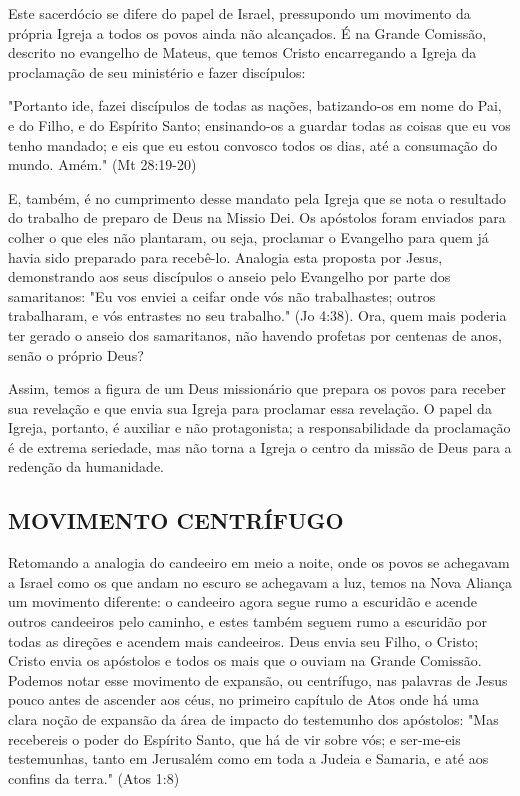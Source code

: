 \documentclass[
    article,            %
	12pt,				%
	oneside,			%
	a4paper,			%
	chapter=TITLE,		%
	section=TITLE,		%
	english,			%
	french,				%
	spanish,			%
	brazil				%
	]{abntex2}
\begin{document}
Este sacerdócio se difere do papel de Israel, pressupondo um movimento da própria Igreja a todos os povos ainda não alcançados. É na Grande Comissão, descrito no evangelho de Mateus, que temos Cristo encarregando a Igreja da proclamação de seu ministério e fazer discípulos:
\begin{citacao}
"Portanto ide, fazei discípulos de todas as nações, batizando-os em nome do Pai, e do Filho, e do Espírito Santo; ensinando-os a guardar todas as coisas que eu vos tenho mandado; e eis que eu estou convosco todos os dias, até a consumação do mundo. Amém." (Mt 28:19-20)
\end{citacao}
E, também, é no cumprimento desse mandato pela Igreja que se nota o resultado do trabalho de preparo de Deus na Missio Dei. Os apóstolos foram enviados para colher o que eles não plantaram, ou seja, proclamar o Evangelho para quem já havia sido preparado para recebê-lo. Analogia esta proposta por Jesus, demonstrando aos seus discípulos o anseio pelo Evangelho por parte dos samaritanos: "Eu vos enviei a ceifar onde vós não trabalhastes; outros trabalharam, e vós entrastes no seu trabalho." (Jo 4:38). Ora, quem mais poderia ter gerado o anseio dos samaritanos, não havendo profetas por centenas de anos, senão o próprio Deus?

Assim, temos a figura de um Deus missionário que prepara os povos para receber sua revelação e que envia sua Igreja para proclamar essa revelação. O papel da Igreja, portanto, é auxiliar e não protagonista; a responsabilidade da proclamação é de extrema seriedade, mas não torna a Igreja o centro da missão de Deus para a redenção da humanidade.

\subsection{MOVIMENTO CENTRÍFUGO}
Retomando a analogia do candeeiro em meio a noite, onde os povos se achegavam a Israel como os que andam no escuro se achegavam a luz, temos na Nova Aliança um movimento diferente: o candeeiro agora segue rumo a escuridão e acende outros candeeiros pelo caminho, e estes também seguem rumo a escuridão por todas as direções e acendem mais candeeiros. Deus envia seu Filho, o Cristo; Cristo envia os apóstolos e todos os mais que o ouviam na Grande Comissão. Podemos notar esse movimento de expansão, ou centrífugo, nas palavras de Jesus pouco antes de ascender aos céus, no primeiro capítulo de Atos onde há uma clara noção de expansão da área de impacto do testemunho dos apóstolos: "Mas recebereis o poder do Espírito Santo, que há de vir sobre vós; e ser-me-eis testemunhas, tanto em Jerusalém como em toda a Judeia e Samaria, e até aos confins da terra." (Atos 1:8)
\end{document}
